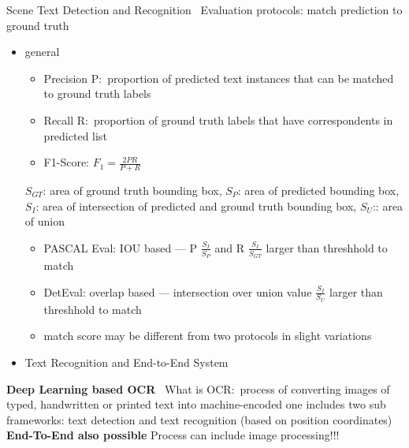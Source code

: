 Scene Text Detection and Recognition~\cite{long_scene_2021}
Evaluation protocols: match prediction to ground truth
\begin{itemize}
    \item general
        \begin{itemize}
            \item Precision P:\ proportion of predicted text instances that can be matched to ground
                truth labels
            \item Recall R:\ proportion of ground truth labels that have correspondents in predicted
                list
            \item F1-Score: $F_1=\frac{2PR}{P+R}$
        \end{itemize}
        $S_{GT}$: area of ground truth bounding box, $S_P$: area of predicted bounding box,
        $S_I$: area of intersection of predicted and ground truth bounding box, $S_U$:: area of union
        \begin{itemize}
            \item PASCAL Eval: IOU based --- P $\frac{S_I}{S_P}$ and R $\frac{S_I}{S_{GT}}$ larger
                than threshhold to match
            \item DetEval: overlap based --- intersection over union value $\frac{S_I}{S_U}$
                larger than threshhold to match
            \item match score may be different from two protocols in slight variations
        \end{itemize}
    \item Text Recognition and End-to-End System
\end{itemize}

\textbf{Deep Learning based OCR}~\citep{zhao_improving_2020}
What is OCR:\ process of converting images of typed, handwritten or printed text into machine-encoded one
includes two sub frameworks: text detection and text recognition (based on position coordinates)
\textbf{End-To-End also possible}
Process can include image processing!!!

